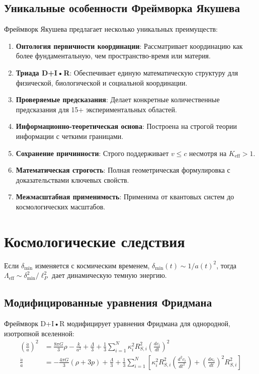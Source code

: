 \documentclass[11pt,a4paper]{article}
\begin{document}
	\subsection{Уникальные особенности Фреймворка Якушева}
	
	Фреймворк Якушева предлагает несколько уникальных преимуществ:
	
	\begin{enumerate}
		\item \textbf{Онтология первичности координации}: Рассматривает координацию как более фундаментальную, чем пространство-время или материя.
		
		\item \textbf{Триада D+I•R}: Обеспечивает единую математическую структуру для физической, биологической и социальной координации.
		
		\item \textbf{Проверяемые предсказания}: Делает конкретные количественные предсказания для 15+ экспериментальных областей.
		
		\item \textbf{Информационно-теоретическая основа}: Построена на строгой теории информации с четкими границами.
		
		\item \textbf{Сохранение причинности}: Строго поддерживает $v \leq c$ несмотря на $K_{\mathrm{eff}} > 1$.
		
		\item \textbf{Математическая строгость}: Полная геометрическая формулировка с доказательствами ключевых свойств.
		
		\item \textbf{Межмасштабная применимость}: Применима от квантовых систем до космологических масштабов.
	\end{enumerate}
	
	\section{Космологические следствия}
	Если $\delta_{\min}$ изменяется с космическим временем, $\delta_{\min}(t) \sim 1/a(t)^2$, тогда $\Lambda_{\text{eff}} \sim \delta_{\min}^2/\ell_P^2$ дает динамическую темную энергию.
	\subsection{Модифицированные уравнения Фридмана}
	
	Фреймворк D+I•R модифицирует уравнения Фридмана для однородной, изотропной вселенной:
	\begin{align}
		\left(\frac{\dot{a}}{a}\right)^2 &= \frac{8\pi G}{3}\rho - \frac{k}{a^2} + \frac{\Lambda}{3} + \frac{1}{3}\sum_{i=1}^N \kappa_i^2 R_{S,i}^2 \left(\frac{dc_i}{dt}\right)^2 \\
		\frac{\ddot{a}}{a} &= -\frac{4\pi G}{3}(\rho + 3p) + \frac{\Lambda}{3} + \frac{1}{3}\sum_{i=1}^N \left[ \kappa_i^2 R_{S,i}^2 \left(\frac{d^2c_i}{dt^2}\right) + \left(\frac{d\kappa_i}{dt}\right)^2 R_{S,i}^2 \right]
	\end{align}
	
\end{document}
